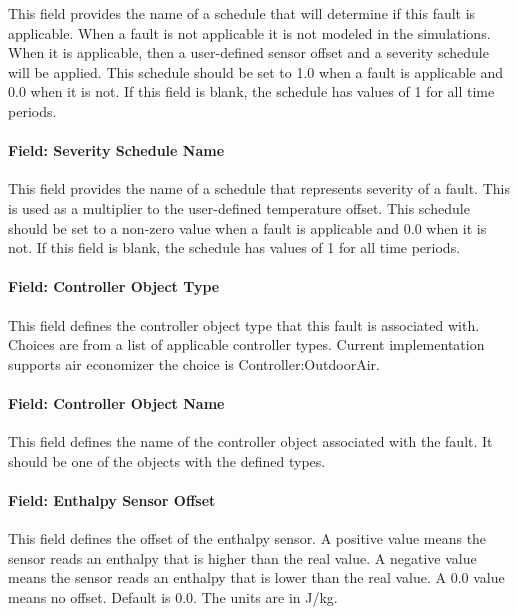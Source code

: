 This field provides the name of a schedule that will determine if this fault is applicable. When a fault is not applicable it is not modeled in the simulations. When it is applicable, then a user-defined sensor offset and a severity schedule will be applied. This schedule should be set to 1.0 when a fault is applicable and 0.0 when it is not. If this field is blank, the schedule has values of 1 for all time periods.

\paragraph{Field: Severity Schedule Name}\label{field-severity-schedule-name-2}

This field provides the name of a schedule that represents severity of a fault. This is used as a multiplier to the user-defined temperature offset. This schedule should be set to a non-zero value when a fault is applicable and 0.0 when it is not. If this field is blank, the schedule has values of 1 for all time periods.

\paragraph{Field: Controller Object Type}\label{field-controller-object-type-2}

This field defines the controller object type that this fault is associated with. Choices are from a list of applicable controller types. Current implementation supports air economizer the choice is Controller:OutdoorAir.

\paragraph{Field: Controller Object Name}\label{field-controller-object-name-2}

This field defines the name of the controller object associated with the fault. It should be one of the objects with the defined types.

\paragraph{Field: Enthalpy Sensor Offset}\label{field-enthalpy-sensor-offset}

This field defines the offset of the enthalpy sensor. A positive value means the sensor reads an enthalpy that is higher than the real value. A negative value means the sensor reads an enthalpy that is lower than the real value. A 0.0 value means no offset. Default is 0.0. The units are in J/kg.

